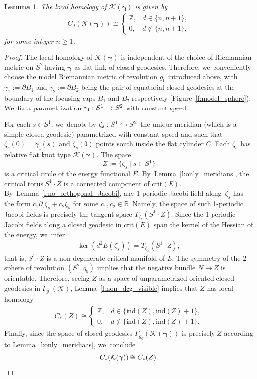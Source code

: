 \documentclass[11pt]{article}
\let\sep\mid
\newcommand\hto{\mathrel{\lhook\joinrel\to}}
\let\bm\boldsymbol
\newcommand{\Z}{\mathbb{Z}}
\newcommand{\R}{\mathbb{R}}
\newcommand{\KK}{\mathcal{K}}
\newcommand{\crit}{\mathrm{crit}}
\newcommand{\ind}{\mathrm{ind}}
\theoremstyle{plain}
\newtheorem{Lemma}[Thm]{Lemma}
\theoremstyle{definition}
\begin{document}
\begin{Lemma}\label{l:K_gamma1_gamma2}
The local homology of $\KK(\bm\gamma)$ is given by
\begin{align*}
C_d(\KK(\bm\gamma))
\cong
\begin{cases}
\Z, & d\in\{n,n+1\}, \\
0, & d\not\in\{n,n+1\},
\end{cases}
\end{align*}
for some integer $n\geq1$.
\end{Lemma}

\begin{proof}
The local homology of $\KK(\bm\gamma)$ is independent of the choice of Riemannian metric on $S^2$ having $\bm\gamma$ as flat link of closed geodesics. Therefore, we~conveniently choose the model Riemannian metric of revolution $g_0$ introduced above, with $\gamma_1:=\partial B_1$ and $\gamma_2:=\partial B_2$ being the pair of equatorial closed geodesics at the boundary of the focusing caps $B_1$ and $B_2$ respectively (Figure~\ref{f:model_sphere}). We~fix a parametrization $\gamma_1:S^1\hto S^2$ with constant speed.

For each $s\in S^1$, we~denote by $\zeta_s:S^1\hto S^2$ the unique meridian (which is a simple closed geodesic) parametrized with constant speed and such that $\zeta_s(0)=\gamma_1(s)$ and $\dot\zeta_s(0)$ points south inside the flat cylinder $C$. Each $\zeta_s$ has relative flat knot type $\KK(\bm\gamma)$.
The space
\[
Z:=\big\{\zeta_s\sep s\in S^1\big\}
\]
is a critical circle of the energy functional $E$. By~Lemma~\ref{l:only_meridians}, the critical torus $S^1\cdot Z$ is a connected component of $\crit(E)$. By~Lemma~\ref{l:no_orthogonal_Jacobi}, any 1-periodic Jacobi field along~$\zeta_s$ has the form $c_1\partial_s\zeta_s+c_2\dot\zeta_s$ for some $c_1,c_2\in\R$. Namely, the space of such 1-periodic Jacobi fields is precisely the tangent space $T_{\zeta_s}(S^1\cdot Z)$. Since the 1-periodic Jacobi fields along a closed geodesic in $\crit(E)$ span the kernel of the Hessian of the energy, we~infer
\begin{align*}
\ker(d^2E(\zeta_s)) = T_{\zeta_s}(S^1\cdot Z),
\end{align*}
that is, $S^1\cdot Z$ is a non-degenerate critical manifold of $E$. The symmetry of the $2$\nobreakdash-sphere of revolution $(S^2,g_0)$ implies that the negative bundle $N\to Z$ is orientable. Therefore, seeing $Z$ as a space of unparametrized oriented closed geodesics in $\Gamma_{g_0}(\KK)$, Lemma~\ref{l:non_deg_visible} implies that $Z$ has local homology
\begin{align*}
C_*(Z)
\cong
\begin{cases}
\Z, & d\in\{\ind(Z),\ind(Z)+1\}, \\
0, & d\not\in\{\ind(Z),\ind(Z)+1\}.
\end{cases}
\end{align*}
Finally, since the space of closed geodesics $\Gamma_{g_0}(\KK(\bm\gamma))$ is precisely $Z$ according to Lemma~\ref{l:only_meridians}, we~conclude
\[
C_*(\KK(\bm\gamma))\cong C_*(Z).
\qedhere
\]
\end{proof}
\end{document}
